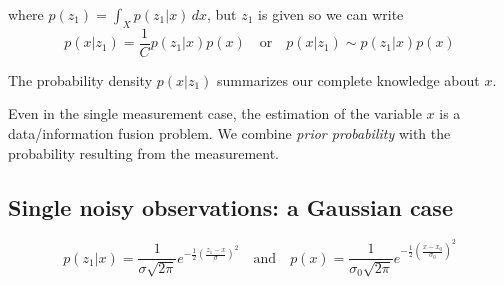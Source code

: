 where $p(z_1) = \int_X p(z_1|x) \,dx$, but $z_1$ is given so we can write
\begin{equation*}
  p(x|z_1) = \frac{1}{C} p(z_1|x) p(x) \quad \text{or} \quad
    p(x|z_1) \sim p(z_1|x) p(x)
\end{equation*}

The probability density $p(x|z_1)$ summarizes our complete knowledge about $x$.
\begin{remark}
  Even in the single measurement case, the estimation of the variable $x$ is a
  data/information fusion problem. We combine \textit{prior probability} with
  the probability resulting from the measurement.
\end{remark}

\subsection{Single noisy observations: a Gaussian case}
\begin{equation*}
  p(z_1|x) = \frac{1}{\sigma \sqrt{2\pi}} e^{-\frac{1}{2}
    \left(\frac{z_1 - x}{\sigma}\right)^2}
  \quad \text{and} \quad
  p(x) = \frac{1}{\sigma_0 \sqrt{2\pi}} e^{-\frac{1}{2}
    \left(\frac{x - x_0}{\sigma_0}\right)^2}
\end{equation*}

